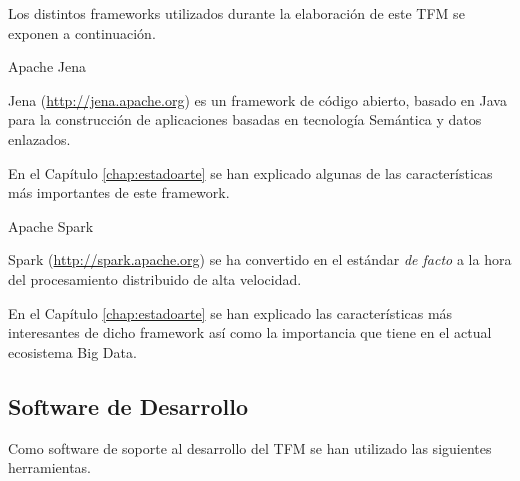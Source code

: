 Los distintos frameworks utilizados durante la elaboración de este \acs{TFM} se
exponen a continuación. 

\begin{definitionlist} 

\item[Apache Jena]

Jena (\url{http://jena.apache.org}) es un framework de código abierto, basado en
Java para la construcción de aplicaciones basadas en tecnología Semántica y
datos enlazados. 

En el Capítulo \ref{chap:estadoarte} se han explicado algunas de las
características más importantes de este framework. 

\item[Apache Spark]

  Spark (\url{http://spark.apache.org}) se ha convertido en el estándar
  \textit{de facto} a la hora del procesamiento distribuido de alta velocidad.

  En el Capítulo \ref{chap:estadoarte} se han explicado las características más
  interesantes de dicho framework así como la importancia que tiene en el actual
  ecosistema Big Data. 

\end{definitionlist}

\subsection{Software de Desarrollo}

Como software de soporte al desarrollo del \acs{TFM} se han utilizado las
siguientes herramientas. 

